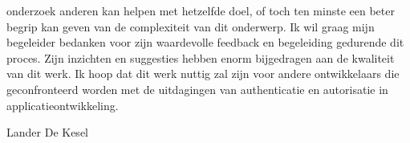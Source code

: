 onderzoek anderen kan helpen met hetzelfde doel, of toch ten minste een beter begrip kan geven van de complexiteit van dit onderwerp.
\newline
\newline
Ik wil graag mijn begeleider bedanken voor zijn waardevolle feedback en begeleiding gedurende dit proces. Zijn inzichten en suggesties hebben enorm bijgedragen aan de kwaliteit van dit werk. 
\newline
\newline
Ik hoop dat dit werk nuttig zal zijn voor andere ontwikkelaars die geconfronteerd worden met de uitdagingen van authenticatie en autorisatie in applicatieontwikkeling.

\begin{flushright}
Lander De Kesel
\end{flushright}